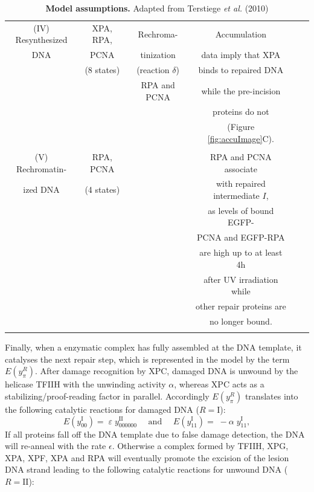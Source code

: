\begin{table}[h]
{\begin{tabular}{cccccc}
			\rule{0pt}{3ex}
			(IV) Resynthesized&XPA, RPA,&Rechroma-&Accumulation&\cite{Moser2005}\\
			DNA&	 PCNA& tinization& data imply that XPA&  \cite{Shivji:1995:Biochemistry:7711023}\\
			&(8 states)&(reaction $\delta$)& binds  to repaired DNA &\cite{Luijsterburg2010}\\
			&&RPA and PCNA&while the pre-incision &\\
			&&&	  proteins do not &\\
			&&& (Figure \ref{fig:accuImage}C).&\\
			&&&& \\ \hline
			\rule{0pt}{3ex}
			(V) Rechromatin- &RPA, PCNA &&RPA and PCNA associate&\cite{Riedl2003}\\
			ized DNA &(4 states)	&&with repaired intermediate $I$,&\cite{Luijsterburg2010}\\
			&&&as levels of bound EGFP-&\\
			&&&PCNA and EGFP-RPA&\\ 
			&&& are  high up to at least 4h&\\
			&&& after UV irradiation while&\\
			&&& other repair proteins are&\\   
			&&& no longer bound.&\\   &&&& \\ \hline
		\end{tabular}}
		\caption{\textbf{Model assumptions.} Adapted from Terstiege \textit{et al.} (2010) \cite{Terstiege2010}}\label{tab:modelassumptions}
	\end{table}\clearpage
	


Finally, when a enzymatic complex has fully assembled at the DNA template, it catalyses the next repair step, which is represented in the model by the term $E(y_{\pi}^{R})$. After damage recognition by XPC, damaged DNA is unwound by the helicase TFIIH with the unwinding activity $\alpha$, whereas XPC acts as a stabilizing/proof-reading factor in parallel. Accordingly $E(y_{\pi}^{R})$ translates into the following catalytic reactions for damaged DNA ($R= \text{I}$):
$$E(y_{00}^\text{I})=\;\varepsilon\;y_{000000}^\text{II} \quad \text{ and }\quad
E(y_{11}^\text{I})=\;-\alpha \;y_{11}^\text{I},$$
If all proteins fall off the DNA template due to false damage detection, the DNA will re-anneal with the rate $\epsilon$. Otherwise a complex formed by TFIIH, XPG, XPA, XPF, XPA and RPA will eventually promote the excision of the lesion DNA strand leading to the following catalytic reactions for unwound DNA ($R= \text{II}$): 

